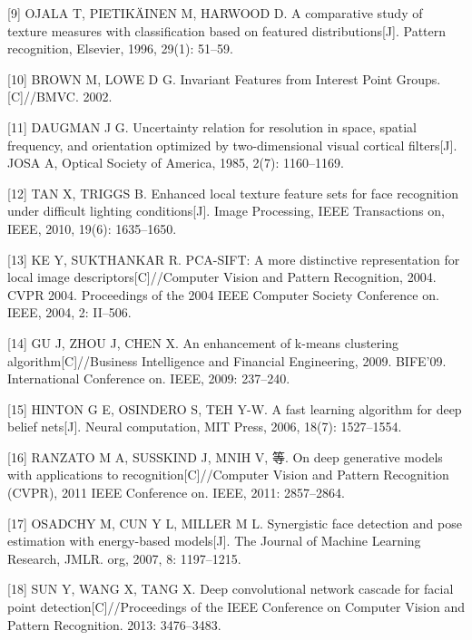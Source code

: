 \documentclass[bachelor,zhspacing]{cqu}  %
\begin{document}
\hypertarget{ref-ojala1996comparative}{}
{[}9{]} OJALA T, PIETIKÄINEN M, HARWOOD D. A comparative study of
texture measures with classification based on featured
distributions{[}J{]}. Pattern recognition, Elsevier, 1996, 29(1):
51--59.

\hypertarget{ref-brown2002invariant}{}
{[}10{]} BROWN M, LOWE D G. Invariant Features from Interest Point
Groups.{[}C{]}//BMVC. 2002.

\hypertarget{ref-daugman1985uncertainty}{}
{[}11{]} DAUGMAN J G. Uncertainty relation for resolution in space,
spatial frequency, and orientation optimized by two-dimensional visual
cortical filters{[}J{]}. JOSA A, Optical Society of America, 1985, 2(7):
1160--1169.

\hypertarget{ref-tan2010enhanced}{}
{[}12{]} TAN X, TRIGGS B. Enhanced local texture feature sets for face
recognition under difficult lighting conditions{[}J{]}. Image
Processing, IEEE Transactions on, IEEE, 2010, 19(6): 1635--1650.

\hypertarget{ref-ke2004pca}{}
{[}13{]} KE Y, SUKTHANKAR R. PCA-SIFT: A more distinctive representation
for local image descriptors{[}C{]}//Computer Vision and Pattern
Recognition, 2004. CVPR 2004. Proceedings of the 2004 IEEE Computer
Society Conference on. IEEE, 2004, 2: II--506.

\hypertarget{ref-gu2009enhancement}{}
{[}14{]} GU J, ZHOU J, CHEN X. An enhancement of k-means clustering
algorithm{[}C{]}//Business Intelligence and Financial Engineering, 2009.
BIFE'09. International Conference on. IEEE, 2009: 237--240.

\hypertarget{ref-hinton2006fast}{}
{[}15{]} HINTON G E, OSINDERO S, TEH Y-W. A fast learning algorithm for
deep belief nets{[}J{]}. Neural computation, MIT Press, 2006, 18(7):
1527--1554.

\hypertarget{ref-ranzato2011deep}{}
{[}16{]} RANZATO M A, SUSSKIND J, MNIH V, 等. On deep generative models
with applications to recognition{[}C{]}//Computer Vision and Pattern
Recognition (CVPR), 2011 IEEE Conference on. IEEE, 2011: 2857--2864.

\hypertarget{ref-osadchy2007synergistic}{}
{[}17{]} OSADCHY M, CUN Y L, MILLER M L. Synergistic face detection and
pose estimation with energy-based models{[}J{]}. The Journal of Machine
Learning Research, JMLR. org, 2007, 8: 1197--1215.

\hypertarget{ref-sun2013deep}{}
{[}18{]} SUN Y, WANG X, TANG X. Deep convolutional network cascade for
facial point detection{[}C{]}//Proceedings of the IEEE Conference on
Computer Vision and Pattern Recognition. 2013: 3476--3483.
\end{document}
